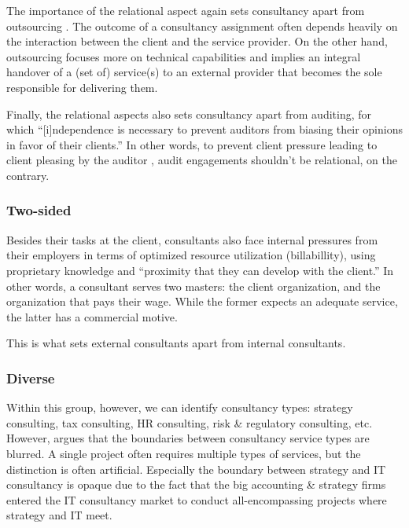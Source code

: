 \documentclass[12pt]{article}
\begin{document}
The importance of the relational aspect again sets consultancy apart
from outsourcing \citep[ 171-173]{kipping2012}. The outcome of a
consultancy assignment often depends heavily on the interaction between
the client and the service provider. On the other hand, outsourcing
focuses more on technical capabilities and implies an integral handover
of a (set of) service(s) to an external provider that becomes the sole
responsible for delivering them.

Finally, the relational aspects also sets consultancy apart from
auditing, for which ``{[}i{]}ndependence is necessary to prevent
auditors from biasing their opinions in favor of their clients.''
\citep[ 310]{bazerman2011} In other words, to prevent client pressure
leading to client pleasing by the auditor \citep{koch2017}, audit
engagements shouldn't be relational, on the contrary.

\hypertarget{two-sided}{%
\subsubsection{Two-sided}\label{two-sided}}

Besides their tasks at the client, consultants also face internal
pressures from their employers in terms of optimized resource
utilization (billabillity), using proprietary knowledge and ``proximity
that they can develop with the client.'' \citet[138]{chowdhury2021} In
other words, a consultant serves two masters: the client organization,
and the organization that pays their wage. While the former expects an
adequate service, the latter has a commercial motive. \citep[
270]{furusten2012}

This is what sets external consultants apart from internal consultants.

\hypertarget{diverse}{%
\subsubsection{Diverse}\label{diverse}}

Within this group, however, we can identify consultancy types: strategy
consulting, tax consulting, HR consulting, risk \& regulatory
consulting, etc. However, \citet[71-72]{armbruster2006} argues that the
boundaries between consultancy service types are blurred. A single
project often requires multiple types of services, but the distinction
is often artificial. Especially the boundary between strategy and IT
consultancy is opaque due to the fact that the big accounting \&
strategy firms entered the IT consultancy market to conduct
all-encompassing projects where strategy and IT meet.
\end{document}
